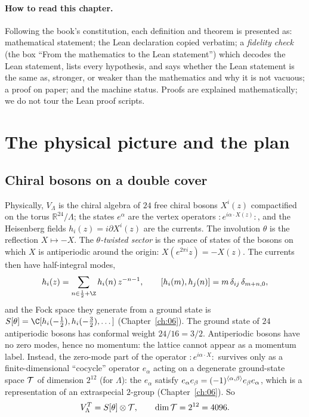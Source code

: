 \paragraph{How to read this chapter.}  Following the book's constitution, each definition and
theorem is presented as: mathematical statement; the Lean declaration copied verbatim; a
\emph{fidelity check} (the box ``From the mathematics to the Lean statement'') which decodes the
Lean statement, lists every hypothesis, and says whether the Lean statement is the same as,
stronger, or weaker than the mathematics and why it is not vacuous; a proof on paper; and the
machine status.  Proofs are explained mathematically; we do not tour the Lean proof scripts.

\section{The physical picture and the plan}\label{ch08:sec:physics}

\subsection{Chiral bosons on a double cover}
Physically, $V_\Lambda$ is the chiral algebra of $24$ free chiral bosons $X^i(z)$ compactified on
the torus $\mathbb{R}^{24}/\Lambda$; the states $e^\alpha$ are the vertex operators
$:\!e^{i\alpha\cdot X(z)}\!:$, and the Heisenberg fields $h_i(z)=i\partial X^i(z)$ are the
currents.  The involution $\theta$ is the reflection $X\mapsto -X$.  The \emph{$\theta$-twisted
sector} is the space of states of the bosons on which $X$ is antiperiodic around the origin:
$X(e^{2\pi i}z)=-X(z)$.  The currents then have half-integral modes,
\begin{equation*}
  h_i(z)=\sum_{n\in\frac12+\Z} h_i(n)\,z^{-n-1},\qquad [h_i(m),h_j(n)]=m\,\delta_{ij}\,\delta_{m+n,0},
\end{equation*}
and the Fock space they generate from a ground state is $\cheightS=\C[h_i(-\tfrac12),
h_i(-\tfrac32),\dots]$ (Chapter~\ref{ch:06}).  The ground state of $24$ antiperiodic bosons has
conformal weight $24/16=3/2$.  Antiperiodic bosons have no zero modes, hence no momentum: the
lattice cannot appear as a momentum label.  Instead, the zero-mode part of the operator
$:\!e^{i\alpha\cdot X}\!:$ survives only as a finite-dimensional ``cocycle'' operator $e_\alpha$
acting on a degenerate ground-state space $\mathcal{T}$ of dimension $2^{12}$ (for $\Lambda$): the
$e_\alpha$ satisfy $e_\alpha e_\beta=(-1)^{\langle \alpha,\beta\rangle}e_\beta e_\alpha$, which is a
representation of an extraspecial $2$-group (Chapter~\ref{ch:06}).  So
\begin{equation*}
  V_\Lambda^T=S[\theta]\otimes\mathcal{T} ,\qquad \dim\mathcal{T}=2^{12}=4096 .
\end{equation*}

